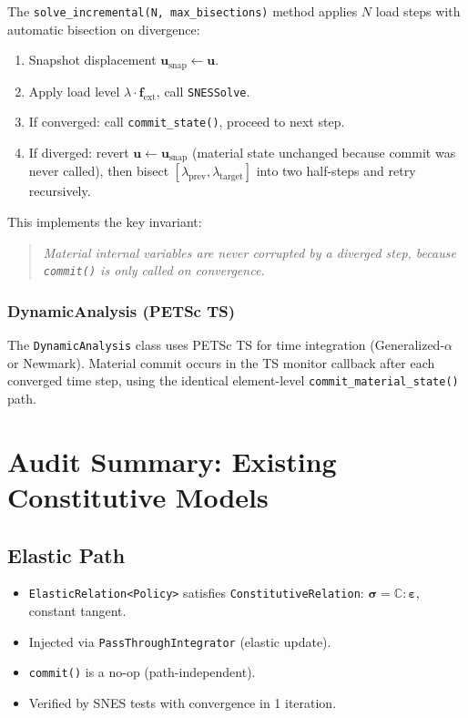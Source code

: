 The \texttt{solve\_incremental(N, max\_bisections)} method applies
$N$ load steps with automatic bisection on divergence:

\begin{enumerate}
  \item Snapshot displacement $\mathbf{u}_{\text{snap}} \leftarrow \mathbf{u}$.
  \item Apply load level $\lambda \cdot \mathbf{f}_{\mathrm{ext}}$,
        call \texttt{SNESSolve}.
  \item If converged: call \texttt{commit\_state()}, proceed to
        next step.
  \item If diverged: revert $\mathbf{u} \leftarrow \mathbf{u}_{\text{snap}}$
        (material state unchanged because commit was never called),
        then bisect $[\lambda_{\text{prev}}, \lambda_{\text{target}}]$
        into two half-steps and retry recursively.
\end{enumerate}

This implements the key invariant:
\begin{quote}
  \emph{Material internal variables are never corrupted by a diverged
  step, because \texttt{commit()} is only called on convergence.}
\end{quote}

\subsubsection{DynamicAnalysis (PETSc TS)}

The \texttt{DynamicAnalysis} class uses PETSc TS for time integration
(Generalized-$\alpha$ or Newmark).  Material commit occurs in the TS
monitor callback after each converged time step, using the identical
element-level \texttt{commit\_material\_state()} path.


\section{Audit Summary: Existing Constitutive Models}
\label{sec:phase1-audit-models}

\subsection{Elastic Path}

\begin{itemize}
  \item \texttt{ElasticRelation<Policy>} satisfies
        \texttt{ConstitutiveRelation}: $\boldsymbol{\sigma} =
        \mathbb{C} : \boldsymbol{\varepsilon}$, constant tangent.
  \item Injected via \texttt{PassThroughIntegrator} (elastic update).
  \item \texttt{commit()} is a no-op (path-independent).
  \item Verified by SNES tests with convergence in 1 iteration.
\end{itemize}

